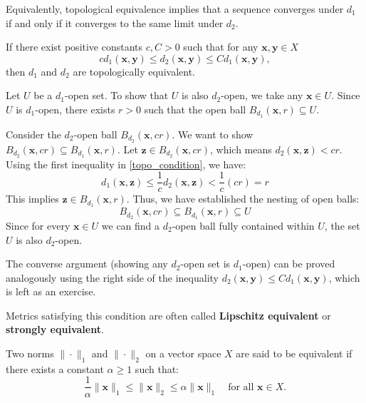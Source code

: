 \begin{remark}
Equivalently, topological equivalence implies that a sequence converges under $d_1$ if and only if it converges to the same limit under $d_2$.
\end{remark}

\begin{theorem}
    If there exist positive constants $c, C > 0$ such that for any $\mathbf{x}, \mathbf{y} \in X$
    \begin{equation} \label{topo_condition}
    c d_1(\mathbf{x},\mathbf{y}) \le d_2(\mathbf{x},\mathbf{y}) \le C d_1(\mathbf{x},\mathbf{y}),
    \end{equation}
    then $d_1$ and $d_2$ are topologically equivalent. 
\end{theorem}

\begin{pfbox}
Let $U$ be a $d_1$-open set. To show that $U$ is also $d_2$-open, we take any $\mathbf{x} \in U$. Since $U$ is $d_1$-open, there exists $r > 0$ such that the open ball $B_{d_1}(\mathbf{x}, r) \subseteq U$. 

Consider the $d_2$-open ball $B_{d_2}(\mathbf{x}, cr)$. We want to show $B_{d_2}(\mathbf{x}, cr) \subseteq B_{d_1}(\mathbf{x}, r)$.
Let $\mathbf{z} \in B_{d_2}(\mathbf{x}, cr)$, which means $d_2(\mathbf{x},\mathbf{z}) < cr$. 
Using the first inequality in \eqref{topo_condition}, we have:
\[
d_1(\mathbf{x},\mathbf{z}) \le \frac{1}{c}d_2(\mathbf{x},\mathbf{z}) < \frac{1}{c}(cr) = r
\]
This implies $\mathbf{z} \in B_{d_1}(\mathbf{x}, r)$. Thus, we have established the nesting of open balls:
\[
B_{d_2}(\mathbf{x}, cr) \subseteq B_{d_1}(\mathbf{x}, r) \subseteq U
\]
Since for every $\mathbf{x} \in U$ we can find a $d_2$-open ball fully contained within $U$, the set $U$ is also $d_2$-open.

The converse argument (showing any $d_2$-open set is $d_1$-open) can be proved analogously using the right side of the inequality $d_2(\mathbf{x},\mathbf{y}) \le C d_1(\mathbf{x},\mathbf{y})$, which is left as an exercise. 
\end{pfbox}

\begin{remark}
Metrics satisfying this condition are often called \textbf{Lipschitz equivalent} or \textbf{strongly equivalent}.
\end{remark}


\begin{definition}
Two norms $\|\cdot\|_1$ and $\|\cdot\|_2$ on a vector space $X$ are said to be equivalent if there exists a constant $\alpha \ge 1$ such that:
$$ \frac{1}{\alpha}\|\mathbf{x}\|_1 \le \|\mathbf{x}\|_2 \le \alpha\|\mathbf{x}\|_1 \quad \text{for all } \mathbf{x} \in X. $$
\end{definition}

